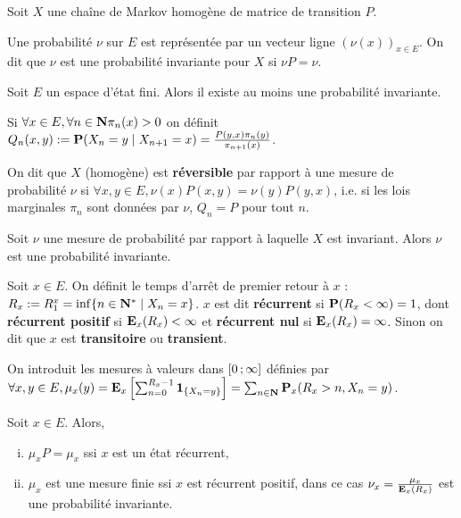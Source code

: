 Soit $X$ une chaîne de Markov homogène de matrice de transition $P$.

\begin{defn}
	Une probabilité $\nu$ sur $E$ est représentée par un vecteur ligne $(\nu(x))_{x \in E}$.
	On dit que $\nu$ est une probabilité invariante pour $X$ si $\nu P = \nu$.
\end{defn}

\begin{thm}
	Soit $E$ un espace d'état fini.
	Alors il existe au moins une probabilité invariante.
\end{thm}

Si $\forall x \in E, \forall n \in \mathbf{N}\pi_n(x) > 0$ on définit $Q_n(x,y) := \mathbf{P}(X_n = y \mid X_{n + 1} = x) = \frac{P(y,x) \pi_n(y)}{\pi_{n + 1}(x)}$.

\begin{defn}
	On dit que $X$ (homogène) est \textbf{réversible} par rapport à une mesure de probabilité $\nu$ si $\forall x,y \in E, \nu(x) P(x,y) = \nu(y) P(y,x)$, i.e. si les lois marginales $\pi_n$ sont données par $\nu$, $Q_n = P$ pour tout $n$.
\end{defn}

\begin{pop}
	Soit $\nu$ une mesure de probabilité par rapport à laquelle $X$ est invariant.
	Alors $\nu$ est une probabilité invariante.
\end{pop}

\begin{defn}
	Soit $x \in E$.
	On définit le temps d'arrêt de premier retour à $x$ : $R_x := R_1^x = \inf \{ n \in \mathbf{N}^* \mid X_n = x \}$.
	$x$ est dit \textbf{récurrent} si $\mathbf{P}(R_x < \infty) = 1$, dont \textbf{récurrent positif} si $\mathbf{E}_x(R_x) < \infty$ et \textbf{récurrent nul} si $\mathbf{E}_x(R_x) = \infty$.
	Sinon on dit que $x$ est \textbf{transitoire} ou \textbf{transient}.
\end{defn}

On introduit les mesures à valeurs dans $\mathopen{[}0\mathclose{}\mathpunct{};\infty\mathclose{]}$ définies par $\forall x,y \in E, \mu_x(y) = \mathbf{E}_x \left[ \sum_{n = 0}^{R_x - 1} \operatorname{\mathbf{1}}_{\{ X_n = y \} } \right] = \sum_{n \in \mathbf{N}} \mathbf{P}_x(R_x > n, X_n = y)$.

\begin{pop}
	Soit $x \in E$. Alors,
	\begin{enumerate}[(i)]
		\item $\mu_x P = \mu_x$ ssi $x$ est un état récurrent,
		\item $\mu_x$ est une mesure finie ssi $x$ est récurrent positif, dans ce cas $\nu_x = \frac{\mu_x}{\mathbf{E}_x(R_x)}$ est une probabilité invariante.
	\end{enumerate}
\end{pop}

